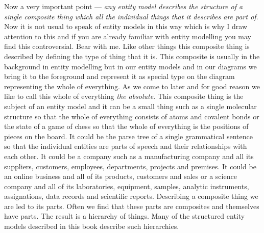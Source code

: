 \mynote
Now a very  important point ---
\textit{any entity model describes the structure of a single composite thing which all the individual things that it describes are part of}. Now it is not usual to speak of entity models in this way which is why I draw attention to this and if you are already familiar with entity modelling you may find this controversial. Bear with me.
\mynote
Like other things this composite thing is described by defining the type of thing that it is. This composite is usually in the background in entity modelling but in our entity models and in our diagrams we bring it to the foreground and represent it as special type on the diagram representing the whole of everything. As we come to later and for good reason we like to call this whole of everything \textit{the absolute}.   This composite thing  is the subject of an entity model and it can be a small thing such as a single molecular structure so that the whole of everything consists of atoms and covalent bonds or the state of a game of chess so that the whole of everything is the positions of pieces on the board. It could be the parse tree of a single grammatical sentence so that the individual entities are parts of speech and their relationships with each other. It could be a company such as a manufacturing company and all its suppliers, customers, employees, departments, projects and premises. 
It could be an online business and all of its products, customers and sales or
a science company and all of its laboratories, equipment, samples, analytic instruments, assignations, data records and  scientific reports. 
\mynote
Describing a composite thing we are led to its parts. Often we find that these parts are composites and themselves have parts. The result is a hierarchy of things. Many of the structured entity models described in this book describe such hierarchies. 

